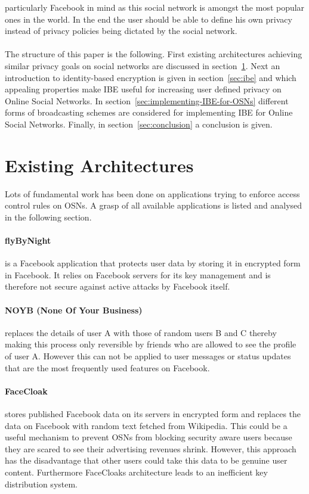 \documentclass[journal]{IEEEtran}
\begin{document}
particularly Facebook in mind as this social network is amongst the most
popular ones in the world. In the end the user should be able to define his
own privacy instead of privacy policies being dictated by the social network.\\
\\
The structure of this paper is the following. First existing architectures
achieving similar privacy goals on social networks are discussed in
section~\ref{sec:existing-architectures}. Next an introduction to identity-based
encryption is given in section~\ref{sec:ibe} and which appealing properties make
IBE useful for increasing user defined privacy on Online Social Networks. In
section~\ref{sec:implementing-IBE-for-OSNs} different forms of broadcasting
schemes are considered for implementing IBE for Online Social Networks.
Finally, in section~\ref{sec:conclusion} a conclusion is given.


\section{Existing
Architectures~\cite{BeatoScramble}}\label{sec:existing-architectures}
Lots of fundamental work has been done on applications trying to enforce
access control rules on OSNs. A grasp of all available applications is
listed and analysed in the following section.

\paragraph{flyByNight} is a Facebook application that protects user data by
storing it in encrypted form in Facebook. It relies on Facebook servers for its
key management and is therefore not secure against active attacks by Facebook
itself.

\paragraph{NOYB (None Of Your Business)} replaces the details of user A with
those of random users B and C thereby making this process only reversible by
friends who are allowed to see the profile of user A. However this can not be
applied to user messages or status updates that are the most frequently used
features on Facebook.

\paragraph{FaceCloak} stores published Facebook data on its servers in encrypted
form and replaces the data on Facebook with random text fetched from Wikipedia.
This could be a useful mechanism to prevent OSNs from blocking security
aware users because they are scared to see their advertising revenues shrink.
However, this approach has the disadvantage that other users could take this
data to be genuine user content. Furthermore FaceCloaks architecture leads to an
inefficient key distribution system.
\end{document}
